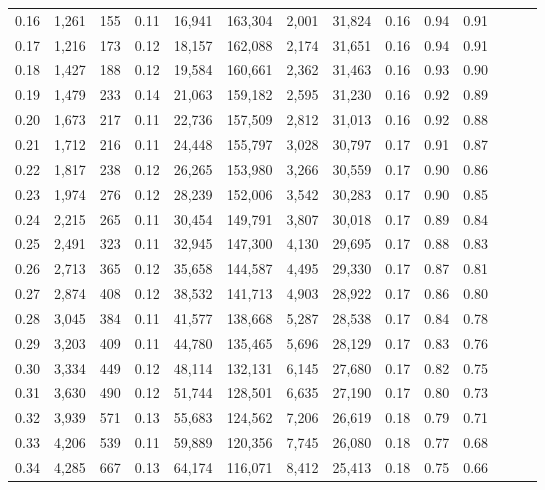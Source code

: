 \begin{tabular}{rrrrrrrrrrrrrr}
0.16 &  1,261 &  155 &  0.11 &   16,941 &  163,304 &   2,001 &  31,824 &  0.16 &  0.94 &      0.91 \\
0.17 &  1,216 &  173 &  0.12 &   18,157 &  162,088 &   2,174 &  31,651 &  0.16 &  0.94 &      0.91 \\
0.18 &  1,427 &  188 &  0.12 &   19,584 &  160,661 &   2,362 &  31,463 &  0.16 &  0.93 &      0.90 \\
0.19 &  1,479 &  233 &  0.14 &   21,063 &  159,182 &   2,595 &  31,230 &  0.16 &  0.92 &      0.89 \\
0.20 &  1,673 &  217 &  0.11 &   22,736 &  157,509 &   2,812 &  31,013 &  0.16 &  0.92 &      0.88 \\
0.21 &  1,712 &  216 &  0.11 &   24,448 &  155,797 &   3,028 &  30,797 &  0.17 &  0.91 &      0.87 \\
0.22 &  1,817 &  238 &  0.12 &   26,265 &  153,980 &   3,266 &  30,559 &  0.17 &  0.90 &      0.86 \\
0.23 &  1,974 &  276 &  0.12 &   28,239 &  152,006 &   3,542 &  30,283 &  0.17 &  0.90 &      0.85 \\
0.24 &  2,215 &  265 &  0.11 &   30,454 &  149,791 &   3,807 &  30,018 &  0.17 &  0.89 &      0.84 \\
0.25 &  2,491 &  323 &  0.11 &   32,945 &  147,300 &   4,130 &  29,695 &  0.17 &  0.88 &      0.83 \\
0.26 &  2,713 &  365 &  0.12 &   35,658 &  144,587 &   4,495 &  29,330 &  0.17 &  0.87 &      0.81 \\
0.27 &  2,874 &  408 &  0.12 &   38,532 &  141,713 &   4,903 &  28,922 &  0.17 &  0.86 &      0.80 \\
0.28 &  3,045 &  384 &  0.11 &   41,577 &  138,668 &   5,287 &  28,538 &  0.17 &  0.84 &      0.78 \\
0.29 &  3,203 &  409 &  0.11 &   44,780 &  135,465 &   5,696 &  28,129 &  0.17 &  0.83 &      0.76 \\
0.30 &  3,334 &  449 &  0.12 &   48,114 &  132,131 &   6,145 &  27,680 &  0.17 &  0.82 &      0.75 \\
0.31 &  3,630 &  490 &  0.12 &   51,744 &  128,501 &   6,635 &  27,190 &  0.17 &  0.80 &      0.73 \\
0.32 &  3,939 &  571 &  0.13 &   55,683 &  124,562 &   7,206 &  26,619 &  0.18 &  0.79 &      0.71 \\
0.33 &  4,206 &  539 &  0.11 &   59,889 &  120,356 &   7,745 &  26,080 &  0.18 &  0.77 &      0.68 \\
0.34 &  4,285 &  667 &  0.13 &   64,174 &  116,071 &   8,412 &  25,413 &  0.18 &  0.75 &      0.66 \\

\end{tabular}
